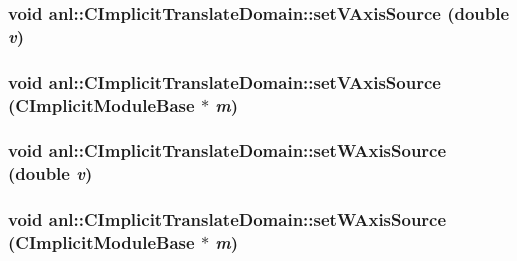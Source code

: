 \label{classanl_1_1CImplicitTranslateDomain_adb76061648e6d25c567b7bcf2da81869}
\hypertarget{classanl_1_1CImplicitTranslateDomain_ae16f4e19d5a442ac5f387c2324b22f3a}{
\subsubsection[{setVAxisSource}]{\setlength{\rightskip}{0pt plus 5cm}void anl::CImplicitTranslateDomain::setVAxisSource (double {\em v})}}
\label{classanl_1_1CImplicitTranslateDomain_ae16f4e19d5a442ac5f387c2324b22f3a}
\hypertarget{classanl_1_1CImplicitTranslateDomain_ab034bbff48e9b745f9cef9ca4c00ad59}{
\subsubsection[{setVAxisSource}]{\setlength{\rightskip}{0pt plus 5cm}void anl::CImplicitTranslateDomain::setVAxisSource ({\bf CImplicitModuleBase} $\ast$ {\em m})}}
\label{classanl_1_1CImplicitTranslateDomain_ab034bbff48e9b745f9cef9ca4c00ad59}
\hypertarget{classanl_1_1CImplicitTranslateDomain_a522576d3aad43fcfb80a877a3208866e}{
\subsubsection[{setWAxisSource}]{\setlength{\rightskip}{0pt plus 5cm}void anl::CImplicitTranslateDomain::setWAxisSource (double {\em v})}}
\label{classanl_1_1CImplicitTranslateDomain_a522576d3aad43fcfb80a877a3208866e}
\hypertarget{classanl_1_1CImplicitTranslateDomain_ac834b7b2164fb488b159015c478d7c2b}{
\subsubsection[{setWAxisSource}]{\setlength{\rightskip}{0pt plus 5cm}void anl::CImplicitTranslateDomain::setWAxisSource ({\bf CImplicitModuleBase} $\ast$ {\em m})}}
